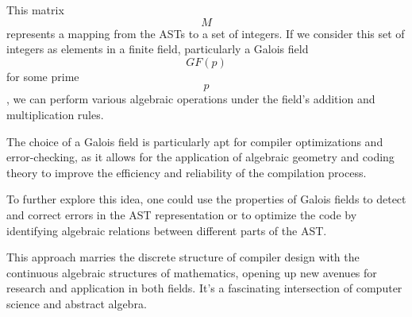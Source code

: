 \documentclass{article}
\begin{document}
This matrix $$ M $$ represents a mapping from the ASTs to a set of integers. If we consider this set of integers as elements in a finite field, particularly a Galois field $$ GF(p) $$ for some prime $$ p $$, we can perform various algebraic operations under the field's addition and multiplication rules.

The choice of a Galois field is particularly apt for compiler optimizations and error-checking, as it allows for the application of algebraic geometry and coding theory to improve the efficiency and reliability of the compilation process.

To further explore this idea, one could use the properties of Galois fields to detect and correct errors in the AST representation or to optimize the code by identifying algebraic relations between different parts of the AST.

This approach marries the discrete structure of compiler design with the continuous algebraic structures of mathematics, opening up new avenues for research and application in both fields. It's a fascinating intersection of computer science and abstract algebra.


 
\end{document}
